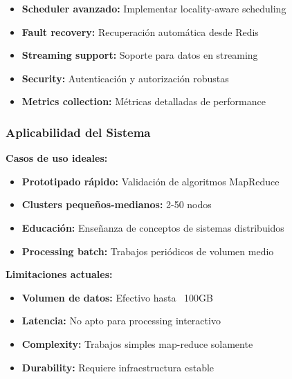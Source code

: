 \begin{itemize}
    \item \textbf{Scheduler avanzado:} Implementar locality-aware scheduling
    \item \textbf{Fault recovery:} Recuperación automática desde Redis
    \item \textbf{Streaming support:} Soporte para datos en streaming
    \item \textbf{Security:} Autenticación y autorización robustas
    \item \textbf{Metrics collection:} Métricas detalladas de performance
\end{itemize}

\subsubsection{Aplicabilidad del Sistema}

\textbf{Casos de uso ideales:}
\begin{itemize}
    \item \textbf{Prototipado rápido:} Validación de algoritmos MapReduce
    \item \textbf{Clusters pequeños-medianos:} 2-50 nodos
    \item \textbf{Educación:} Enseñanza de conceptos de sistemas distribuidos
    \item \textbf{Processing batch:} Trabajos periódicos de volumen medio
\end{itemize}

\textbf{Limitaciones actuales:}
\begin{itemize}
    \item \textbf{Volumen de datos:} Efectivo hasta ~100GB
    \item \textbf{Latencia:} No apto para processing interactivo
    \item \textbf{Complexity:} Trabajos simples map-reduce solamente
    \item \textbf{Durability:} Requiere infraestructura estable
\end{itemize}
